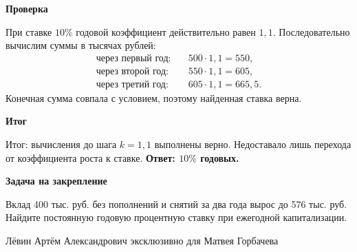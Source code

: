 \documentclass[12pt,a4paper]{article}
\newcommand{\rubric}[1]{\par\smallskip\noindent\textbf{#1}\par\nobreak\smallskip}
\begin{document}
\rubric{Проверка}
При ставке $10\%$ годовой коэффициент действительно равен $1{,}1$. Последовательно вычислим суммы в тысячах рублей:
\[
\begin{aligned}
\text{через первый год:}\quad &500\cdot1{,}1=550,\\
\text{через второй год:}\quad &550\cdot1{,}1=605,\\
\text{через третий год:}\quad &605\cdot1{,}1=665{,}5.
\end{aligned}
\]
Конечная сумма совпала с условием, поэтому найденная ставка верна.

\rubric{Итог}
\textcolor{teal!60!black}{Итог:} вычисления до шага $k=1{,}1$ выполнены верно. Недоставало лишь перехода от коэффициента роста к ставке. \textbf{Ответ: $10\%$ годовых.}

\rubric{Задача на закрепление}
Вклад 400 тыс. руб. без пополнений и снятий за два года вырос до 576 тыс. руб. Найдите постоянную годовую процентную ставку при ежегодной капитализации.

\vfill
\begin{center}
\footnotesize Лёвин Артём Александрович эксклюзивно для Матвея Горбачева
\end{center}
\end{document}
